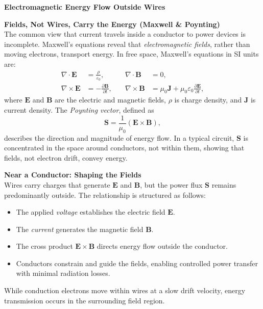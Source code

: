 \begin{technical}
\sloppy
{\Large\textbf{Electromagnetic Energy Flow Outside Wires}}

\noindent\textbf{Fields, Not Wires, Carry the Energy (Maxwell \& Poynting)}\\[0.5em]
The common view that current travels inside a conductor to power devices is incomplete. Maxwell’s equations reveal that \textit{electromagnetic fields}, rather than moving electrons, transport energy. In free space, Maxwell’s equations in SI units are:
\begin{align*}
\nabla \cdot \mathbf{E} &= \frac{\rho}{\varepsilon_0}, 
&\quad \nabla \cdot \mathbf{B} &= 0,\\
\nabla \times \mathbf{E} &= -\frac{\partial \mathbf{B}}{\partial t},
&\quad \nabla \times \mathbf{B} &= \mu_0 \mathbf{J} + \mu_0 \varepsilon_0 \frac{\partial \mathbf{E}}{\partial t},
\end{align*}
where \(\mathbf{E}\) and \(\mathbf{B}\) are the electric and magnetic fields, \(\rho\) is charge density, and \(\mathbf{J}\) is current density. The \textit{Poynting vector}, defined as
\[
\mathbf{S} = \frac{1}{\mu_0} (\mathbf{E} \times \mathbf{B}),
\]
describes the direction and magnitude of energy flow. In a typical circuit, \(\mathbf{S}\) is concentrated in the space around conductors, not within them, showing that fields, not electron drift, convey energy.

\vspace{0.7em}
\noindent\textbf{Near a Conductor: Shaping the Fields}\\[0.5em]
Wires carry charges that generate \(\mathbf{E}\) and \(\mathbf{B}\), but the power flux \(\mathbf{S}\) remains predominantly outside. The relationship is structured as follows:
\begin{itemize}[leftmargin=*]
\item The applied \textit{voltage} establishes the electric field \(\mathbf{E}\). 
\item The \textit{current} generates the magnetic field \(\mathbf{B}\).
\item The cross product \(\mathbf{E} \times \mathbf{B}\) directs energy flow outside the conductor.
\item Conductors constrain and guide the fields, enabling controlled power transfer with minimal radiation losses.
\end{itemize}
While conduction electrons move within wires at a slow drift velocity, energy transmission occurs in the surrounding field region.


\end{technical}
